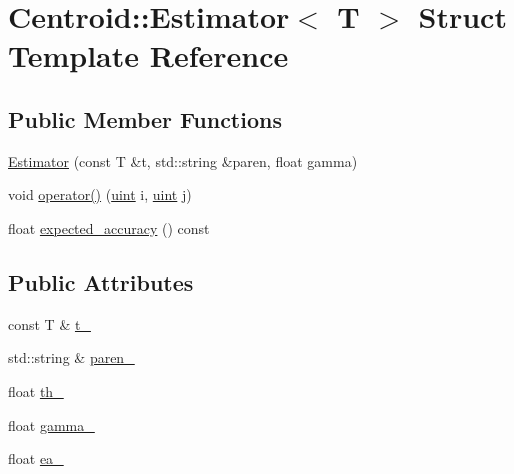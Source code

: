 \hypertarget{struct_centroid_1_1_estimator}{\section{Centroid\+:\+:Estimator$<$ T $>$ Struct Template Reference}
\label{struct_centroid_1_1_estimator}
}
\subsection*{Public Member Functions}
\begin{DoxyCompactItemize}
\item 
\hyperlink{struct_centroid_1_1_estimator_a7a50661ee30722b56662bc7f2c55dd37}{Estimator} (const T \&t, std\+::string \&paren, float gamma)
\item 
void \hyperlink{struct_centroid_1_1_estimator_a558db229a035aa52e265bed449e9fbe6}{operator()} (\hyperlink{cyktable_8h_a91ad9478d81a7aaf2593e8d9c3d06a14}{uint} i, \hyperlink{cyktable_8h_a91ad9478d81a7aaf2593e8d9c3d06a14}{uint} j)
\item 
float \hyperlink{struct_centroid_1_1_estimator_a03f33ccedc9616b7e13743a6d63a86ac}{expected\+\_\+accuracy} () const 
\end{DoxyCompactItemize}
\subsection*{Public Attributes}
\begin{DoxyCompactItemize}
\item 
const T \& \hyperlink{struct_centroid_1_1_estimator_a877f55030c8443d3f26dc7d17ff0bbff}{t\+\_\+}
\item 
std\+::string \& \hyperlink{struct_centroid_1_1_estimator_afb0a8a732c11deb042d0bb1ac5bb54ce}{paren\+\_\+}
\item 
float \hyperlink{struct_centroid_1_1_estimator_a3c52755a2eea48a354dfb71eba71600f}{th\+\_\+}
\item 
float \hyperlink{struct_centroid_1_1_estimator_ad22e480a14f6b3217c53ebd4c300e1d0}{gamma\+\_\+}
\item 
float \hyperlink{struct_centroid_1_1_estimator_ad06b2a1760cef4bfd901adb4fc1cdd8c}{ea\+\_\+}
\end{DoxyCompactItemize}


